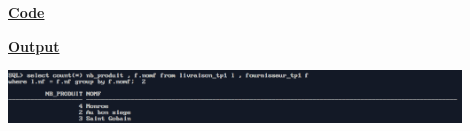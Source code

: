 \newpage
{}

\textbf{\underline{Code}}


\vspace{1cm}
\textbf{\underline{Output}}
\vspace{1cm}
\begin{center}
    \includegraphics[width=0.9\textwidth]{Questions/q35/q35.png}
\end{center}


